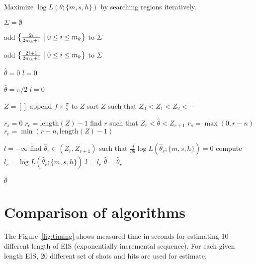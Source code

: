 \documentclass{article}
\begin{document}
\begin{algorithm}
  \caption{Maximize $\log L(\theta; \{m,s,h\})$
    by searching regions iteratively.}
  \label{algo:mlsr-i}
  \begin{algorithmic}[1]
    \State $\Sigma = \emptyset$
    

    \State add $\bigl\{\frac{2i}{2m_k+1} \bigm| 0 \le i \le m_k\bigr\}$
    to $\Sigma$
    \EndIf

    \State add $\bigl\{\frac{2i+1}{2m_k+1} \bigm| 0\le i \le m_k\bigr\}$ to $\Sigma$
    \EndIf

    \If{$0\notin\Sigma$}
    \State $\hat\theta = 0$
    \State $l = 0$

    \ElsIf{$1\notin\Sigma$}
    \State $\hat\theta = \pi/2$
    \State $l = 0$

    \Else
    \State $Z = []$
    \State append $f\times\frac\pi2$ to $Z$
    \EndFor
    \State sort $Z$ such that $Z_0 < Z_1 < Z_2 < \cdots$

    \State $r_s = 0$
    \State $r_e = \text{length}(Z)-1$
    \Else
    \State find $r$ such that $Z_r < \hat\theta < Z_{r+1}$
    \State $r_s = \max(0, r-n)$
    \State $r_e = \min(r+n, \text{length}(Z)-1)$
    \EndIf

    \State $l = -\infty$
    \State find $\hat\theta_r\in(Z_r, Z_{r+1})$ such that
    $\frac{d}{d\theta}\log L(\hat\theta_r;\{m,s,h\}) = 0$
    \State compute $l_r = \log L(\hat\theta_r;\{m,s,h\})$
    \State $l = l_r$
    \State $\hat\theta = \hat\theta_r$
    \EndIf
    \EndFor

    \EndIf

    \EndFor
    \Return $\hat\theta$
    \EndProcedure
  \end{algorithmic}
\end{algorithm}


\section{Comparison of algorithms}
The Figure~\ref{fig:timing} shows measured time in seconds for
estimating 10 different length of EIS (exponentially incremental
sequence).  For each given length EIS, 20 different set of shots
and hits are used for estimate.
\end{document}
